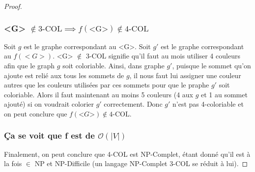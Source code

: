 \documentclass{article}
\theoremstyle{definition}
\theoremstyle{remark}
\begin{document}
\begin{proof}
	\subsubsection{<G> $\notin \text{3-COL} \implies f\left( \text{<G>} \right) \notin \text{4-COL}$}
	Soit $g$ est le graphe correspondant au <G>. Soit $g'$ est le graphe correspondant au $f(<G>)$. <G> $\not\in$ 3-COL signifie qu'il faut au mois utiliser 4 couleurs afin que le graph $g$ soit coloriable. Ainsi, dans graphe $g'$, puisque le sommet qu'on ajoute est relié aux tous les sommets de $g$, il nous faut lui assigner une couleur autres que les couleurs utilisées par ces sommets pour que le praphe $g'$ soit coloriable. Alors il faut maintenant au moins 5 couleurs (4 aux $g$ et 1 au sommet ajouté) si on voudrait colorier  $g'$ correctement. Donc $g'$ n'est pas 4-coloriable et on peut conclure que $ f\left( \text{<}G\text{>} \right) \not\in \text{4-COL}.$
	\subsubsection{ Ça se voit que f est de $\mathcal{O} \left ( |V| \right )  $}

	Finalement, on peut conclure que 4-COL est NP-Complet, étant donné qu'il est à la fois $\in $ NP et NP-Difficile (un langage NP-Complet 3-COL se réduit à lui).
\end{proof}
\end{document}
